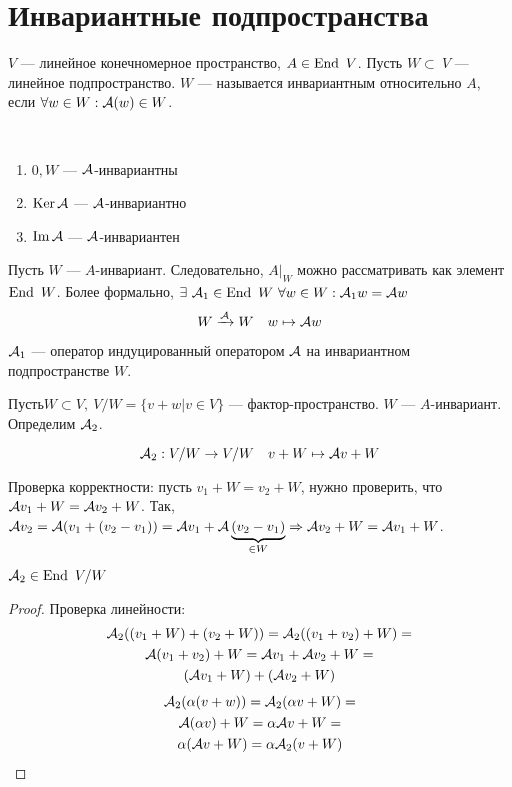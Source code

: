 \documentclass[main]{subfiles}
\begin{document}
\chapter{Инвариантные подпространства}

\begin{definition}
   $V$ — линейное конечномерное пространство, $A\in \operatorname{End} \ V$. Пусть $W\subset \ V$ — линейное подпространство. 
   $W$ — называется инвариантным относительно $A$, если $\forall w\in W : \mathcal{A}(w) \in W$.
\end{definition}

\begin{propertylist} 
    \
    \begin{enumerate}
        \item $0, W$ — $\mathcal{A}$-инвариантны
        \item $\operatorname{Ker} \mathcal{A}$ — $\mathcal{A}$-инвариантно
        \item $\operatorname{Im} \mathcal{A}$ — $\mathcal{A}$-инвариантен
    \end{enumerate}
\end{propertylist}
    


Пусть $W$ — $A$-инвариант. Следовательно, $A|_W$ можно рассматривать как элемент $\End \ W$. 
Более формально, $\exists\  \mathcal{A}_1 \in \operatorname{End} \ W \ \forall w \in W : \mathcal{A}_1 w=\mathcal{A} w$
\[W\xrightarrow{\mathcal{A}} W \quad w\mapsto \mathcal{A} w\]

$\mathcal{A}_1$  —  оператор индуцированный оператором $\mathcal{A}$ на инвариантном подпространстве $W$.

$Пусть W\subset V,\ V/W = \{ v+w |v \in V\}$ — фактор-пространство.  $W$ — $A$-инвариант.
Определим $\mathcal{A}_2$.

\[\mathcal{A}_2: V/W \rightarrow V/W \quad v+W \mapsto \mathcal{A} v+W\]

Проверка корректности: пусть $v_1+W = v_2+W$, нужно проверить, что $\mathcal{A} v_1+W=\mathcal{A} v_2 + W$. Так, $\mathcal{A} v_2= \mathcal{A}(v_1+(v_2-v_1))=\mathcal{A} v_1+ \mathcal{A}\underbrace{(v_2-v_1)}_{\in W} \Rightarrow
 \mathcal{A} v_2 + W= \mathcal{A} v_1+W$.

\begin{proposition} {}
$\mathcal{A}_2 \in \operatorname{End} \ V/W$
\end{proposition}

\begin{proof}
    Проверка линейности:
    \begin{multline*}
        \mathcal{A}_2((v_1+W)+(v_2+W))= \mathcal{A}_2((v_1+v_2)+W)=\\
        \mathcal{A}(v_1+v_2)+W=  \mathcal{A} v_1+\mathcal{A} v_2+W=\\
        (\mathcal{A} v_1+W)+(\mathcal{A} v_2+W)
    \end{multline*}
    \begin{multline*}
        \mathcal{A}_2(\alpha(v+w))= \mathcal{A}_2(\alpha v+W)=\\
        \mathcal{A}(\alpha v)+W= \alpha \mathcal{A} v +W=\\
        \alpha(\mathcal{A} v +W) = \alpha \mathcal{A}_2(v+W)
    \end{multline*}
\end{proof}
\end{document}
